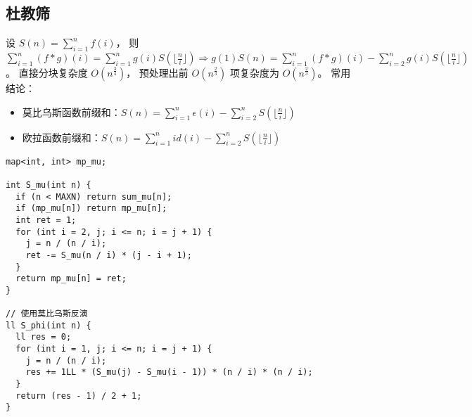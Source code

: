 \subsection{杜教筛}
设 $S(n) = \sum_{i = 1}^{n} f(i)$，
则 $\sum_{i = 1}^{n} (f \ast g)(i) = \sum_{i = 1}^{n} g(i)S(\lfloor \frac{n}{i} \rfloor) \Rightarrow
g(1)S(n) = \sum_{i = 1}^{n} (f \ast g)(i) - \sum_{i = 2}^{n} g(i)S(\lfloor \frac{n}{i} \rfloor)$。
直接分块复杂度 $O(n^{\frac{3}{4}})$，
预处理出前 $O(n^{\frac{2}{3}})$ 项复杂度为 $O(n^{\frac{2}{3}})$。
常用结论：
\begin{itemize}
\item 莫比乌斯函数前缀和：$S(n) = \sum_{i = 1}^{n} \epsilon(i) - \sum_{i = 2}^{n}S(\lfloor \frac{n}{i} \rfloor)$
\item 欧拉函数前缀和：$S(n) = \sum_{i = 1}^{n} id(i) - \sum_{i = 2}^{n}S(\lfloor \frac{n}{i} \rfloor)$
\end{itemize}

\begin{lstlisting}
map<int, int> mp_mu;

int S_mu(int n) {
  if (n < MAXN) return sum_mu[n];
  if (mp_mu[n]) return mp_mu[n];
  int ret = 1;
  for (int i = 2, j; i <= n; i = j + 1) {
    j = n / (n / i);
    ret -= S_mu(n / i) * (j - i + 1);
  }
  return mp_mu[n] = ret;
}

// 使用莫比乌斯反演
ll S_phi(int n) {
  ll res = 0;
  for (int i = 1, j; i <= n; i = j + 1) {
    j = n / (n / i);
    res += 1LL * (S_mu(j) - S_mu(i - 1)) * (n / i) * (n / i);
  }
  return (res - 1) / 2 + 1;
}
\end{lstlisting}
